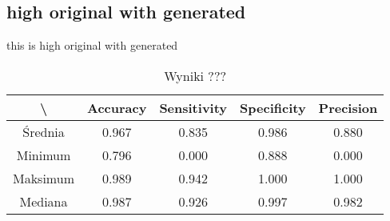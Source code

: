 \subsection{high original with generated}
this is high original with generated

\begin{table}[H]
	\centering
	\caption{Wyniki ???}
	\vspace{6pt}
	{\footnotesize
		\begin{tabular}{|c|c|c|c|c|}
      \hline \textbackslash & Accuracy & Sensitivity & Specificity & Precision \\
      \hline Średnia & 0.967 & 0.835 & 0.986 & 0.880 \\
      \hline Minimum & 0.796 & 0.000 & 0.888 & 0.000 \\
      \hline Maksimum & 0.989 & 0.942 & 1.000 & 1.000 \\
      \hline Mediana & 0.987 & 0.926 & 0.997 & 0.982 \\
      \hline
		\end{tabular}
	}
  \vspace{0pt}
  \label{Tab:high_original_generated_calculated}
\end{table}


